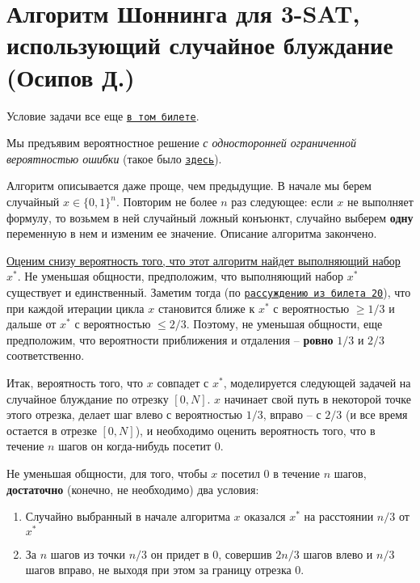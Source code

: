 \section{Алгоритм Шоннинга для 3-SAT, использующий случайное блуждание (Осипов Д.)}

Условие задачи все еще \hyperlink{3sat}{\texttt{в том билете}}.

Мы предъявим вероятностное решение \textit{с односторонней ограниченной вероятностью ошибки} (такое было \hyperlink{Freivalds}{\texttt{здесь}}).


Алгоритм описывается даже проще, чем предыдущие. В начале мы берем случайный $x \in \{0, 1\}^n$. Повторим не более $n$ раз следующее: если $x$ не выполняет формулу, то возьмем в ней случайный ложный конъюнкт, случайно выберем \textbf{одну} переменную в нем и изменим ее значение. Описание алгоритма закончено.

\underline{Оценим снизу вероятность того, что этот алгоритм найдет выполняющий набор} $x^*$. Не уменьшая общности, предположим, что выполняющий набор $x^*$ существует и единственный. Заметим тогда (по \hyperlink{flip20}{\texttt{рассуждению из билета 20}}), что при каждой итерации цикла $x$ становится ближе к $x^*$ с вероятностью $\geq 1/3$ и дальше от $x^*$ с вероятностью $\leq 2/3$. Поэтому, не уменьшая общности, еще предположим, что вероятности приближения и отдаления -- \textbf{ровно} $1/3$ и $2/3$ соответственно.

Итак, вероятность того, что $x$ совпадет с $x^*$, моделируется следующей задачей на случайное блуждание по отрезку $[0, N]$. $x$ начинает свой путь в некоторой точке этого отрезка, делает шаг влево с вероятностью $1/3$, вправо -- с $2/3$ (и все время остается в отрезке $[0, N]$), и необходимо оценить вероятность того, что в течение $n$ шагов он когда-нибудь посетит 0.

Не уменьшая общности, для того, чтобы $x$ посетил 0 в течение $n$ шагов, \textbf{достаточно} (конечно, не необходимо) два условия:
\begin{enumerate}
    \item Случайно выбранный в начале алгоритма $x$ оказался $x^*$ на расстоянии $n/3$ от $x^*$
    \item За $n$ шагов из точки $n/3$ он придет в 0, совершив $2n/3$ шагов влево и $n/3$ шагов вправо, не выходя при этом за границу отрезка 0.
\end{enumerate}

